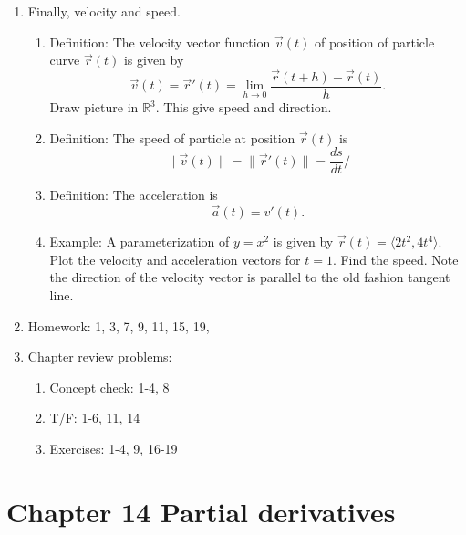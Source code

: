 \documentclass{article}
\begin{document}
\begin{enumerate}

\item Finally, velocity and speed.
\begin{enumerate}
\item Definition: The velocity vector function $\vec{v}(t)$ of position of particle curve $\vec{r}(t)$ is given by 
\[
\vec{v}(t) = \vec{r}'(t) = \lim_{h \rightarrow 0} \frac{\vec{r}(t+h)-\vec{r}(t)}{h}.
\]
Draw picture in $\mathbb{R}^3$. This give speed and direction.
\item Definition: The speed of particle at position $\vec{r}(t)$ is 
\[
\|\vec{v}(t)\| = \|\vec{r}'(t)\| = \frac{ds}{dt}/
\]
\item Definition: The acceleration is
\[
\vec{a}(t) = v'(t).
\]
\item Example: A parameterization of $y=x^2$ is given by $\vec{r}(t) = \langle 2t^2, 4t^4 \rangle$. Plot the velocity and acceleration vectors for $t=1$. Find the speed. Note the direction of the velocity vector is parallel to the old fashion tangent line. 
\end{enumerate}

\item Homework: 1, 3, 7, 9, 11, 15, 19, 

\item Chapter review problems:
\begin{enumerate}
\item Concept check: 1-4, 8
\item T/F: 1-6, 11, 14
\item Exercises: 1-4, 9, 16-19
\end{enumerate}


\end{enumerate}

\section{Chapter 14 Partial derivatives}
\end{document}
